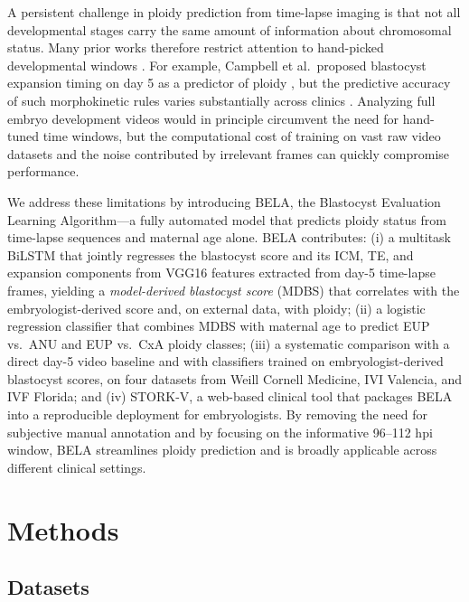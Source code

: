 \documentclass[11pt,a4paper]{article}
\begin{document}
A persistent challenge in ploidy prediction from time-lapse imaging is
that not all developmental stages carry the same amount of information
about chromosomal status. Many prior works therefore restrict attention to
hand-picked developmental windows
\cite{campbell2013modelling,kragh2019automatic}. For example, Campbell et
al.\ proposed blastocyst expansion timing on day 5 as a predictor of
ploidy \cite{campbell2013modelling}, but the predictive accuracy of such
morphokinetic rules varies substantially across clinics
\cite{kramer2014assessing}. Analyzing full embryo development videos would
in principle circumvent the need for hand-tuned time windows, but the
computational cost of training on vast raw video datasets and the noise
contributed by irrelevant frames can quickly compromise performance.

We address these limitations by introducing BELA, the Blastocyst
Evaluation Learning Algorithm---a fully automated model that predicts
ploidy status from time-lapse sequences and maternal age alone. BELA
contributes: (i) a multitask BiLSTM that jointly regresses the blastocyst
score and its ICM, TE, and expansion components from VGG16 features
extracted from day-5 time-lapse frames, yielding a
\emph{model-derived blastocyst score} (MDBS) that correlates with the
embryologist-derived score and, on external data, with ploidy; (ii) a
logistic regression classifier that combines MDBS with maternal age to
predict EUP vs.\ ANU and EUP vs.\ CxA ploidy classes; (iii) a systematic
comparison with a direct day-5 video baseline and with classifiers trained
on embryologist-derived blastocyst scores, on four datasets from Weill
Cornell Medicine, IVI Valencia, and IVF Florida; and (iv) STORK-V, a
web-based clinical tool that packages BELA into a reproducible deployment
for embryologists. By removing the need for subjective manual annotation
and by focusing on the informative 96--112 hpi window, BELA streamlines
ploidy prediction and is broadly applicable across different clinical
settings.

\section{Methods}\label{sec:methods}

\subsection{Datasets}
\end{document}
